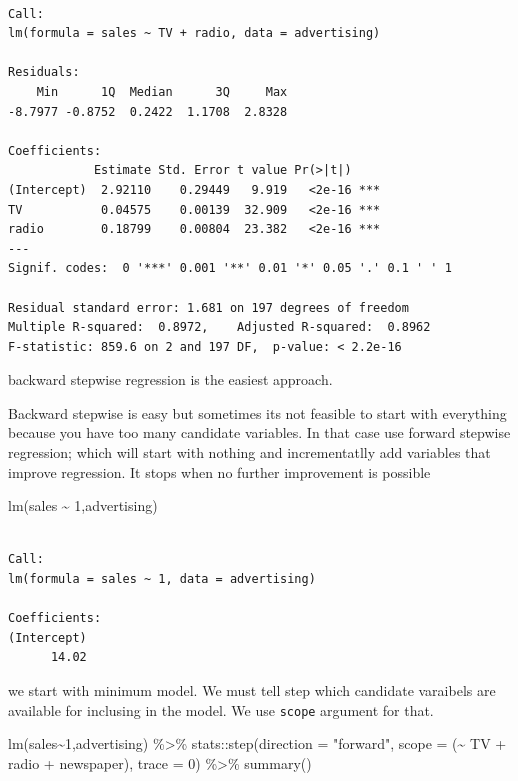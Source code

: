 \documentclass[
  letterpaper,
  DIV=11,
  numbers=noendperiod]{scrreprt}
\newenvironment{Shaded}{\begin{snugshade}}{\end{snugshade}}
\newcommand{\AttributeTok}[1]{\textcolor[rgb]{0.65,0.35,0.00}{#1}}
\newcommand{\DecValTok}[1]{\textcolor[rgb]{0.47,0.16,0.63}{#1}}
\newcommand{\FunctionTok}[1]{\textcolor[rgb]{0.02,0.16,0.49}{#1}}
\newcommand{\NormalTok}[1]{\textcolor[rgb]{0.33,0.33,0.33}{#1}}
\newcommand{\SpecialCharTok}[1]{\textcolor[rgb]{0.00,0.46,0.62}{#1}}
\newcommand{\StringTok}[1]{\textcolor[rgb]{0.00,0.50,0.00}{#1}}
\begin{document}
\begin{verbatim}

Call:
lm(formula = sales ~ TV + radio, data = advertising)

Residuals:
    Min      1Q  Median      3Q     Max 
-8.7977 -0.8752  0.2422  1.1708  2.8328 

Coefficients:
            Estimate Std. Error t value Pr(>|t|)    
(Intercept)  2.92110    0.29449   9.919   <2e-16 ***
TV           0.04575    0.00139  32.909   <2e-16 ***
radio        0.18799    0.00804  23.382   <2e-16 ***
---
Signif. codes:  0 '***' 0.001 '**' 0.01 '*' 0.05 '.' 0.1 ' ' 1

Residual standard error: 1.681 on 197 degrees of freedom
Multiple R-squared:  0.8972,    Adjusted R-squared:  0.8962 
F-statistic: 859.6 on 2 and 197 DF,  p-value: < 2.2e-16
\end{verbatim}

backward stepwise regression is the easiest approach.

Backward stepwise is easy but sometimes its not feasible to start with
everything because you have too many candidate variables. In that case
use forward stepwise regression; which will start with nothing and
incrementatlly add variables that improve regression. It stops when no
further improvement is possible

\begin{Shaded}
\begin{Highlighting}[]
\FunctionTok{lm}\NormalTok{(sales }\SpecialCharTok{\textasciitilde{}} \DecValTok{1}\NormalTok{,advertising)}
\end{Highlighting}
\end{Shaded}

\begin{verbatim}

Call:
lm(formula = sales ~ 1, data = advertising)

Coefficients:
(Intercept)  
      14.02  
\end{verbatim}

we start with minimum model. We must tell step which candidate varaibels
are available for inclusing in the model. We use \texttt{scope} argument
for that.

\begin{Shaded}
\begin{Highlighting}[]
\FunctionTok{lm}\NormalTok{(sales}\SpecialCharTok{\textasciitilde{}}\DecValTok{1}\NormalTok{,advertising) }\SpecialCharTok{\%\textgreater{}\%}\NormalTok{ stats}\SpecialCharTok{::}\FunctionTok{step}\NormalTok{(}\AttributeTok{direction =} \StringTok{"forward"}\NormalTok{, }\AttributeTok{scope =}\NormalTok{ (}\SpecialCharTok{\textasciitilde{}}\NormalTok{ TV }\SpecialCharTok{+}\NormalTok{ radio }\SpecialCharTok{+}\NormalTok{ newspaper), }\AttributeTok{trace =} \DecValTok{0}\NormalTok{) }\SpecialCharTok{\%\textgreater{}\%} \FunctionTok{summary}\NormalTok{() }
\end{Highlighting}
\end{Shaded}
\end{document}
